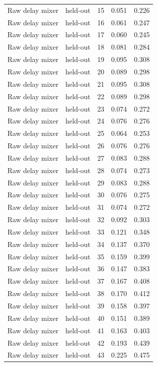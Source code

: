 \begin{tabular}{llrrr}
Raw delay mixer & held-out & 15 & 0.051 & 0.226 \\
Raw delay mixer & held-out & 16 & 0.061 & 0.247 \\
Raw delay mixer & held-out & 17 & 0.060 & 0.245 \\
Raw delay mixer & held-out & 18 & 0.081 & 0.284 \\
Raw delay mixer & held-out & 19 & 0.095 & 0.308 \\
Raw delay mixer & held-out & 20 & 0.089 & 0.298 \\
Raw delay mixer & held-out & 21 & 0.095 & 0.308 \\
Raw delay mixer & held-out & 22 & 0.089 & 0.298 \\
Raw delay mixer & held-out & 23 & 0.074 & 0.272 \\
Raw delay mixer & held-out & 24 & 0.076 & 0.276 \\
Raw delay mixer & held-out & 25 & 0.064 & 0.253 \\
Raw delay mixer & held-out & 26 & 0.076 & 0.276 \\
Raw delay mixer & held-out & 27 & 0.083 & 0.288 \\
Raw delay mixer & held-out & 28 & 0.074 & 0.273 \\
Raw delay mixer & held-out & 29 & 0.083 & 0.288 \\
Raw delay mixer & held-out & 30 & 0.076 & 0.275 \\
Raw delay mixer & held-out & 31 & 0.074 & 0.272 \\
Raw delay mixer & held-out & 32 & 0.092 & 0.303 \\
Raw delay mixer & held-out & 33 & 0.121 & 0.348 \\
Raw delay mixer & held-out & 34 & 0.137 & 0.370 \\
Raw delay mixer & held-out & 35 & 0.159 & 0.399 \\
Raw delay mixer & held-out & 36 & 0.147 & 0.383 \\
Raw delay mixer & held-out & 37 & 0.167 & 0.408 \\
Raw delay mixer & held-out & 38 & 0.170 & 0.412 \\
Raw delay mixer & held-out & 39 & 0.158 & 0.397 \\
Raw delay mixer & held-out & 40 & 0.151 & 0.389 \\
Raw delay mixer & held-out & 41 & 0.163 & 0.403 \\
Raw delay mixer & held-out & 42 & 0.193 & 0.439 \\
Raw delay mixer & held-out & 43 & 0.225 & 0.475 \\

\end{tabular}
